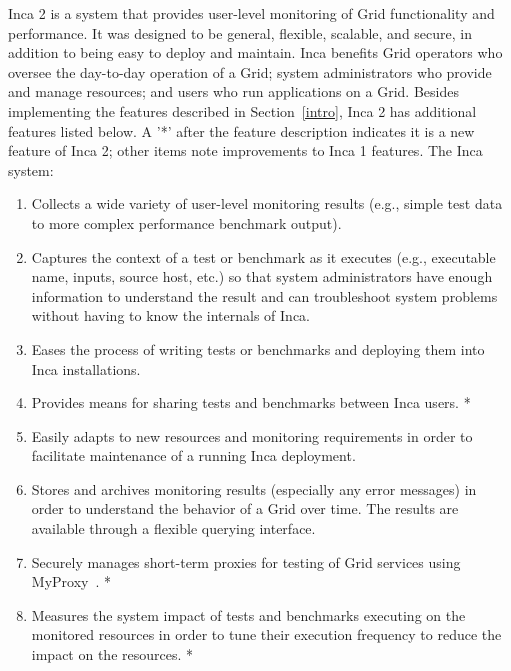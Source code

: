 \documentclass[times,10pt,twocolumn]{article}
\begin{document}
Inca 2 is a system that provides user-level monitoring of Grid functionality
and performance.  It was designed to be
general, flexible, scalable, and secure, in addition to being easy to deploy
and maintain.  Inca benefits Grid operators who oversee the day-to-day
operation of a Grid; system administrators who provide and manage resources;
and users who run applications on a Grid.  Besides implementing the features
described in Section~\ref{intro}, Inca 2 has additional features
listed below.  A '*' after the feature description indicates it is a new
feature of Inca 2; other items note improvements to Inca 1 features.  The 
Inca system:

\begin{enumerate}

\item Collects a wide variety of user-level monitoring results (e.g., simple
test data to more complex performance benchmark output).  

\item Captures the context of a test or benchmark as it executes (e.g.,
executable name, inputs, source host, etc.) so that system administrators have
enough information to understand the result and can troubleshoot system
problems without having to know the internals of Inca. 

\item Eases the process of writing tests or benchmarks and deploying them into
Inca installations. 

\item Provides means for sharing tests and benchmarks between Inca users. *

\item Easily adapts to new resources and monitoring requirements in order to
facilitate maintenance of a running Inca deployment. 

\item Stores and archives monitoring results (especially any error messages) 
in order to understand the behavior of a Grid over time. The results
are available through a flexible querying interface.

\item Securely manages short-term proxies for testing of Grid services using
MyProxy~\cite{myproxy}. *

\item Measures the system impact of tests and benchmarks executing on
the monitored resources in order to tune their execution frequency to
reduce the impact on the resources. *

\end{enumerate}
\end{document}
